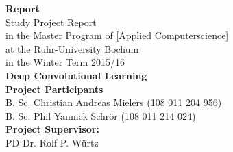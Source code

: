 \documentclass[11pt, a4paper]{article}
\begin{document}
\thispagestyle{empty}

\setlength{\hoffset}{-0.5cm} %

\lstset{
  basicstyle=\small,           %
  breaklines=true,             %
  captionpos=b,                %
  frame=single,                %
  keepspaces=true,             %
  numbers=right,               %
  showspaces=false,            %
  stepnumber=1,                %
  tabsize=4,                   %
  xleftmargin=0.14cm		   %
}


\begin{titlepage}
    \begin{center}
    \vphantom{0cm}
    \LARGE \textbf{Report}\\
    \vspace{3cm}
    \normalsize
    Study Project Report \\
    in the Master Program of \textcolor{AI-BLUE}{[Applied Computerscience]}\\
    at the Ruhr-University Bochum\\
    in the Winter Term 2015/16\\
    \vspace{4cm}
    \huge \textbf{Deep Convolutional Learning} \\
    \vspace{4cm}
    \normalsize
    \textbf{Project Participants}\\
    B. Sc. Christian Andreas Mielers (108 011 204 956)\\
    B. Sc. Phil Yannick Schrör (108 011 214 024)\\
    \vspace{2cm}
    \textbf{Project Supervisor:}\\
    PD Dr. Rolf P. Würtz
    \end{center}
\end{titlepage}

\newpage
{}
\setcounter{page}{2}

\tableofcontents
\end{document}
